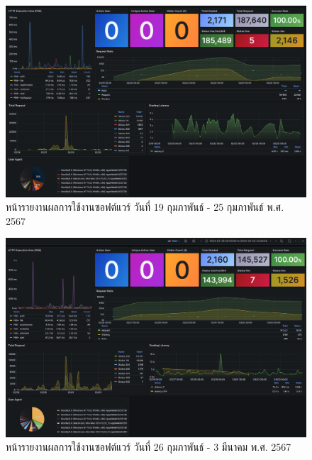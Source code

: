 \documentclass[12pt,one side,openright,a4paper]{cpe-thesis-th}
\begin{document}
\begin{figure}[H]
    \centering
    \includegraphics[width=15cm]{figure/results/grafana/grafana-feb19-feb25.png}
    \caption[หน้ารายงานผลการใช้งานซอฟต์แวร์ วันที่ 19 กุมภาพันธ์ - 25 กุมภาพันธ์ พ.ศ. 2567]{หน้ารายงานผลการใช้งานซอฟต์แวร์ วันที่ 19 กุมภาพันธ์ - 25 กุมภาพันธ์ พ.ศ. 2567}
    \label{fig:res-grafana-f19f25}
\end{figure}

\begin{figure}[H]
    \centering
    \includegraphics[width=15cm]{figure/results/grafana/grafana-feb26-mar03.png}
    \caption[หน้ารายงานผลการใช้งานซอฟต์แวร์ วันที่ 26 กุมภาพันธ์ - 3 มีนาคม พ.ศ. 2567]{หน้ารายงานผลการใช้งานซอฟต์แวร์ วันที่ 26 กุมภาพันธ์ - 3 มีนาคม พ.ศ. 2567}
    \label{fig:res-grafana-f26m03}
\end{figure}
\end{document}

